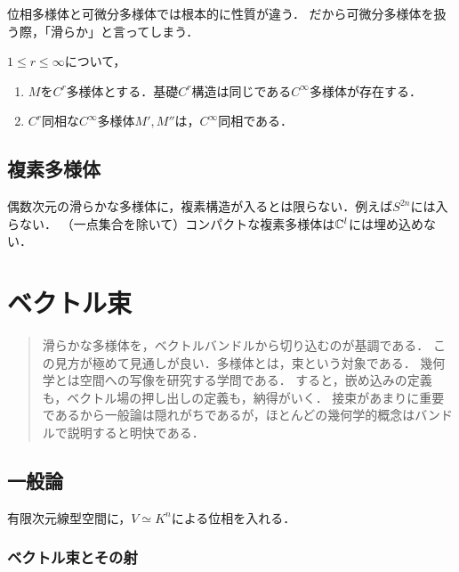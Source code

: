\documentclass[uplatex,dvipdfmx]{jsreport}
\begin{document}
\begin{tcolorbox}[colframe=ForestGreen, colback=ForestGreen!10!white,breakable,colbacktitle=ForestGreen!40!white,coltitle=black,fonttitle=\bfseries\sffamily,
title=]
    位相多様体と可微分多様体では根本的に性質が違う．
    だから可微分多様体を扱う際，「滑らか」と言ってしまう．
\end{tcolorbox}

\begin{theorem}
    $1\le r\le\infty$について，
    \begin{enumerate}
        \item $M$を$C^r$多様体とする．基礎$C^r$構造は同じである$C^\infty$多様体が存在する．
        \item $C^r$同相な$C^\infty$多様体$M',M''$は，$C^\infty$同相である．
    \end{enumerate}
\end{theorem}

\section{複素多様体}

偶数次元の滑らかな多様体に，複素構造が入るとは限らない．例えば$S^{2n}$には入らない．
（一点集合を除いて）コンパクトな複素多様体は$\mathbb{C}^l$には埋め込めない．

\chapter{ベクトル束}

\begin{quotation}
    滑らかな多様体を，ベクトルバンドルから切り込むのが基調である．
    この見方が極めて見通しが良い．多様体とは，束という対象である．
    幾何学とは空間への写像を研究する学問である．
    すると，嵌め込みの定義も，ベクトル場の押し出しの定義も，納得がいく．
    接束があまりに重要であるから一般論は隠れがちであるが，ほとんどの幾何学的概念はバンドルで説明すると明快である．
\end{quotation}

\section{一般論}

有限次元線型空間に，$V\simeq K^n$による位相を入れる．

\subsection{ベクトル束とその射}
\end{document}

